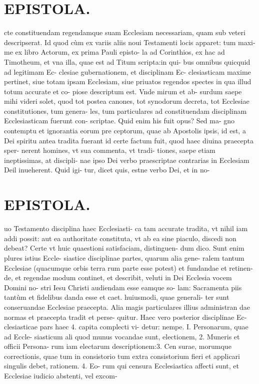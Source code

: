 \documentclass{article}
\begin{document}
\begin{pages}
\section*{EPISTOLA. }\pstart cte constituendam regendamque suam Ecclesiam necessariam, quam sub veteri descripserat. Id quod cùm ex variis aliis noui Testamenti locis apparet: tum maxi- me ex libro Actorum, ex prima Pauli episto- la ad Corinthios, ex hac ad Timotheum, et vna illa, quae est ad Titum scripta:in qui- bus omnibus quicquid ad legitimam Ec- clesiae gubernationem, et disciplinam Ec- clesiasticam maxime pertinet, siue totam ipsam Ecclesiam, siue priuatos regendos spectes in qua illud totum accurate et co- piose descriptum est. Vnde mirum et ab- surdum saepe mihi videri solet, quod tot postea canones, tot synodorum decreta, tot Ecclesiae constitutiones, tum genera- les, tum particulares ad constituendam disciplinam Ecclesiasticam fuerunt con- scriptae. Quid enim his fuit opus? Sed ma- gno contemptu et ignorantia eorum pre ceptorum, quae ab Apostolis ipsis, id est, a Dei spiritu antea tradita fuerant id certe factum fuit, quod haec diuina praecepta sper- nerent homines, vt sua commenta, vt tradi- tiones, saepe etiam ineptissimas, at discipli- nae ipso Dei verbo praescriptae contrarias in Ecclesiam Deil inueherent. Quid igi- tur, dicet quis, estne verbo Dei, et in no-  \pend
\section*{EPISTOLA. }\pstart uo Testamento disciplina haec Ecclesiasti- ca tam accurate tradita, vt nihil iam addi possit: aut ea authoritate constituta, vt ab ea sine piaculo, discedi non debeat? Certe vt huic quaestioni satisfaciam, distinguen- dum dico. Sunt enim plures istius Eccle- siastice disciplinae partes, quarum alia gene- ralem tantum Ecclesiae (quacumque orbis terra rum parte esse potest) et fundandae et retinen- de, et regendae modum continet, et describit, veluti in Dei Ecclesia vocem Domini no- stri Iesu Christi audiendam esse eamque so- lam: Sacramenta piis tantùm et fidelibus danda esse et caet. huiusmodi, quae generali- ter sunt conseruandae Ecclesiae praecepta. Alia magis particulares illius administran dae normas et praecepta tradit et perse- quitur. Haec vero posterior disciplinae Ec- clesiasticae pars haec 4. capita complecti vi- detur: nempe. I. Personarum, quae ad Eccle- siasticum ali quod munus vocandae sunt, electionem, 2. Muneris et officii Persona- rum iam electarum descriptionem:3. Cen surae, morumque correctionis, quae tum in consistorio tum extra consistorium fieri et applicari singulis debet, rationem. 4. Eo- rum qui censura Ecclesiastica affecti sunt, et Ecclesiae iudicio abstenti, vel excom-  \pend

\end{pages}
\end{document}
